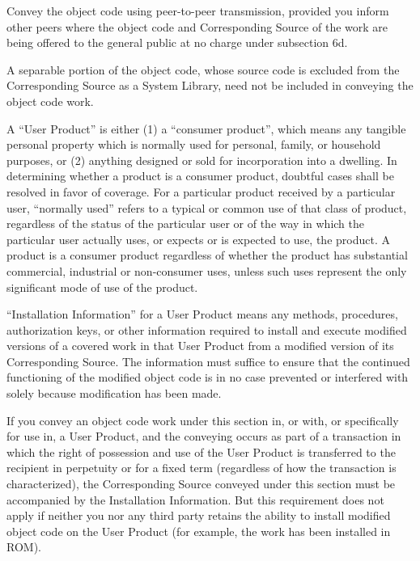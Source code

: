   \item Convey the object code using peer-to-peer transmission, provided
  you inform other peers where the object code and Corresponding
  Source of the work are being offered to the general public at no
  charge under subsection 6d.
  \stopitemize

A separable portion of the object code, whose source code is excluded from the Corresponding Source as a System Library, need not be included in conveying the object code work.

A ``User Product'' is either (1) a ``consumer product'', which means any tangible personal property which is normally used for personal, family, or household purposes, or (2) anything designed or sold for incorporation into a dwelling.  In determining whether a product is a consumer product, doubtful cases shall be resolved in favor of coverage.  For a particular product received by a particular user, ``normally used'' refers to a typical or common use of that class of product, regardless of the status of the particular user or of the way in which the particular user actually uses, or expects or is expected to use, the product.  A product is a consumer product regardless of whether the product has substantial commercial, industrial or non-consumer uses, unless such uses represent the only significant mode of use of the product.

``Installation Information'' for a User Product means any methods, procedures, authorization keys, or other information required to install and execute modified versions of a covered work in that User Product from a modified version of its Corresponding Source.  The information must suffice to ensure that the continued functioning of the modified object code is in no case prevented or interfered with solely because modification has been made.

If you convey an object code work under this section in, or with, or specifically for use in, a User Product, and the conveying occurs as part of a transaction in which the right of possession and use of the User Product is transferred to the recipient in perpetuity or for a fixed term (regardless of how the transaction is characterized), the Corresponding Source conveyed under this section must be accompanied by the Installation Information.  But this requirement does not apply if neither you nor any third party retains the ability to install modified object code on the User Product (for example, the work has been installed in ROM).


